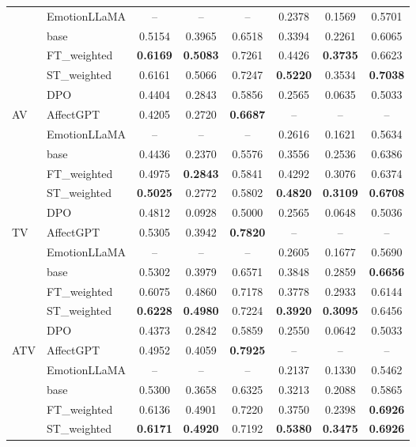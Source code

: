 \begin{table}[t]
\begin{tabular}{llcccccc}
& EmotionLLaMA & -- & -- & -- &  0.2378 & 0.1569 & 0.5701\\
& base & 0.5154 & 0.3965 & 0.6518 &  0.3394 & 0.2261 & 0.6065\\
& FT\_weighted & \textbf{0.6169} & \textbf{0.5083} & 0.7261 & 0.4426 & \textbf{0.3735} & 0.6623 \\
& ST\_weighted & 0.6161 & 0.5066 & 0.7247 & \textbf{0.5220} & 0.3534 & \textbf{0.7038} \\
& DPO & 0.4404 & 0.2843 & 0.5856 & 0.2565 & 0.0635 & 0.5033 \\
\midrule
\multirow{3}{*}{AV}
& AffectGPT & 0.4205 & 0.2720 & \textbf{0.6687} & -- & -- & --\\
& EmotionLLaMA & -- & -- & -- &  0.2616 & 0.1621 & 0.5634 \\
& base & 0.4436 & 0.2370 & 0.5576 &  0.3556 & 0.2536 & 0.6386 \\
& FT\_weighted & 0.4975 & \textbf{0.2843} & 0.5841 & 0.4292 & 0.3076 & 0.6374 \\
& ST\_weighted & \textbf{0.5025} & 0.2772 & 0.5802 & \textbf{0.4820} & \textbf{0.3109} & \textbf{0.6708} \\
& DPO & 0.4812 & 0.0928 & 0.5000 & 0.2565 & 0.0648 & 0.5036 \\
\midrule
\multirow{3}{*}{TV}
& AffectGPT & 0.5305 & 0.3942 & \textbf{0.7820} & -- & -- & --\\
& EmotionLLaMA & -- & -- & -- & 0.2605 & 0.1677 & 0.5690 \\
& base & 0.5302 & 0.3979 & 0.6571 &  0.3848 & 0.2859 & \textbf{0.6656} \\
& FT\_weighted & 0.6075 & 0.4860 & 0.7178 & 0.3778 & 0.2933 & 0.6144\\
& ST\_weighted & \textbf{0.6228} & \textbf{0.4980} & 0.7224 & \textbf{0.3920} &\textbf{0.3095} & 0.6456 \\
& DPO & 0.4373 & 0.2842 & 0.5859 & 0.2550 & 0.0642 & 0.5033 \\
\midrule
\multirow{3}{*}{ATV}
& AffectGPT & 0.4952 & 0.4059 & \textbf{0.7925} & -- & -- & -- \\
& EmotionLLaMA  & -- & -- & -- & 0.2137 & 0.1330 & 0.5462\\
& base & 0.5300 & 0.3658 & 0.6325 &  0.3213 & 0.2088 & 0.5865 \\
& FT\_weighted & 0.6136 & 0.4901 & 0.7220 & 0.3750 & 0.2398 & \textbf{0.6926} \\
& ST\_weighted & \textbf{0.6171} & \textbf{0.4920} & 0.7192 & \textbf{0.5380} & \textbf{0.3475} & \textbf{0.6926} \\

\end{tabular}
\end{table}
